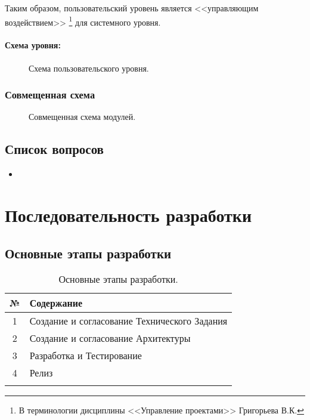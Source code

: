 \documentclass[12pt,a4paper,fullpage,titlepage]{article}
\begin{document}
Таким образом, пользовательский уровень является <<управляющим воздействием>> \footnote{В терминологии дисциплины <<Управление проектами>> Григорьева В.К.} для системного уровня.\\

\paragraph{Схема уровня:}
\begin{figure}[thbp!]
	\centering

	\caption{Схема пользовательского уровня.}
\end{figure}

\newpage
\subsubsection{Совмещенная схема}
\begin{figure}[thbp!]
	\centering

	\caption{Совмещенная схема модулей.}
\end{figure}

\newpage
\subsection{Список вопросов}
\begin{itemize}
	\item
\end{itemize}

\newpage
\section{Последовательность разработки}
\subsection{Основные этапы разработки}
\begin{table}[h]
\begin{tabularx}{\textwidth}{|c|X|}
	\hline
	 № & Содержание\\
	\hline
	1 & Создание и согласование Технического Задания\\
	\hline
	2 & Создание и согласование Архитектуры\\
	\hline
	3 & Разработка и Тестирование\\
	\hline
	4 & Релиз\\
	\hline
	 & \\
	\hline
\end{tabularx}
\caption{Основные этапы разработки.}
\end{table}
\end{document}

